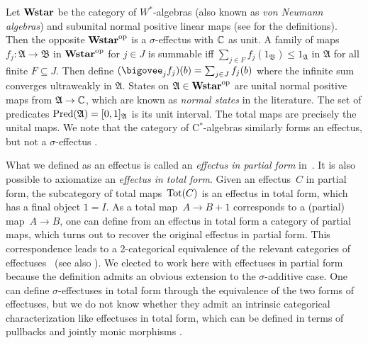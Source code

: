 \documentclass[%
	submission,
copyright,creativecommons,UKenglish]{eptcs}
\begin{document}
\begin{example}\label{ex:wstar}
  Let $\mathbf{Wstar}$ be the category of
  $W^*$-algebras (also known as \emph{von Neumann algebras}) and subunital normal positive linear maps
  (see \cite[\S\,2.6]{Cho2019PhD} for the definitions).
  Then the opposite $\mathbf{Wstar}^{\mathrm{op}}$
  is a $\sigma$-effectus with $\mathbb{C}$ as unit.
  A family of maps $f_j\colon\mathfrak{A}\rightarrow\mathfrak{B}$
  in $\mathbf{Wstar}^{\mathrm{op}}$ for $j\in J$ is summable iff
  $\sum_{j\in F}
  f_j(1_{\mathfrak{B}})\le 1_{\mathfrak{A}}$ in $\mathfrak{A}$
  for all finite $F\subseteq J$.
  Then define $(\bigovee_j f_j)(b) = \sum_{j\in J} f_j(b)$
  where the infinite sum converges ultraweakly in $\mathfrak{A}$.
  States on
  $\mathfrak{A}\in\mathbf{Wstar}^{\mathrm{op}}$ are
  unital normal positive maps from $\mathfrak{A}\to\mathbb{C}$,
  which are
  known as \emph{normal states} in the literature.
  The set of predicates
  $\mathrm{Pred}(\mathfrak{A}) = [0,1]_{\mathfrak{A}}$ is its unit interval.
  The total maps are precisely the unital maps.
  We note that the category of C$^*$-algebras
  similarly forms an effectus, but not a $\sigma$-effectus
  \cite[Example 7.3.36]{Cho2019PhD}.
\end{example}

\begin{remark}\label{partial-total-remark}
  What we defined as an effectus is called an \emph{effectus in
    partial form} in~\cite{cho2015introduction}. It is also possible
  to axiomatize an \emph{effectus in total form}. Given an
  effectus~$C$ in partial form, the subcategory of total
  maps~$\mathrm{Tot}(C)$ is an effectus in total form, which has a final
  object $1=I$. As a total map~$A \to B + 1$ corresponds to a
  (partial) map~$A \to B$, one can define from an effectus in total
  form a category of partial maps, which turns out to recover the
  original effectus in partial form. This correspondence leads to a
  2-categorical equivalence of the relevant categories of
  effectuses~\cite{Cho2015} (see also \cite[\S\,4.2]{Cho2019PhD}).
  We elected to work here with effectuses in partial form because
  the definition admits an obvious extension to the $\sigma$-additive
  case.
  One can define $\sigma$-effectuses in total form
  through the equivalence of the two forms of effectuses,
  but we do not know whether they admit an
  intrinsic categorical characterization
  like effectuses in total form,
  which can be defined in terms of
  pullbacks and jointly monic morphisms
  \cite[Definition 2]{cho2015introduction}.
\end{remark}
\end{document}
